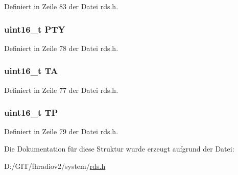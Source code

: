 Definiert in Zeile 83 der Datei rds.\+h.

\hypertarget{structgroup__0b_a0474967478fbbc2c71b800d2e0132d45}{}
\subsubsection[{P\+T\+Y}]{\setlength{\rightskip}{0pt plus 5cm}uint16\+\_\+t P\+T\+Y}\label{structgroup__0b_a0474967478fbbc2c71b800d2e0132d45}


Definiert in Zeile 78 der Datei rds.\+h.

\hypertarget{structgroup__0b_a6de7751205cef4ffcce610399a030892}{}
\subsubsection[{T\+A}]{\setlength{\rightskip}{0pt plus 5cm}uint16\+\_\+t T\+A}\label{structgroup__0b_a6de7751205cef4ffcce610399a030892}


Definiert in Zeile 77 der Datei rds.\+h.

\hypertarget{structgroup__0b_ab9e634c63b0d95a96716d5f6d7f06d72}{}
\subsubsection[{T\+P}]{\setlength{\rightskip}{0pt plus 5cm}uint16\+\_\+t T\+P}\label{structgroup__0b_ab9e634c63b0d95a96716d5f6d7f06d72}


Definiert in Zeile 79 der Datei rds.\+h.



Die Dokumentation für diese Struktur wurde erzeugt aufgrund der Datei\+:\begin{DoxyCompactItemize}
\item 
D\+:/\+G\+I\+T/fhradiov2/system/\hyperlink{rds_8h}{rds.\+h}\end{DoxyCompactItemize}
